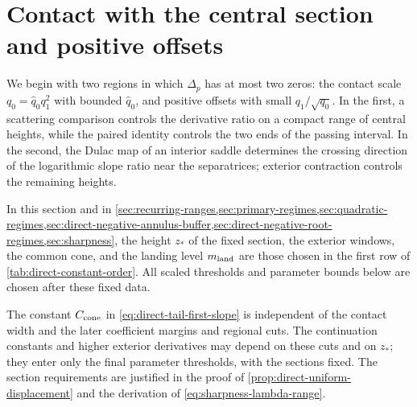 \section{Contact with the central section and positive offsets}
\label{sec:contact-positive-offsets}

We begin with two regions in which \(\Delta_p\) has at most two zeros: the contact scale
\(q_0=\widehat q_0q_1^2\) with bounded \(\widehat q_0\), and positive
offsets with small \(q_1/\sqrt{q_0}\). In the first, a scattering
comparison controls the derivative ratio on a compact range of central
heights, while the paired identity controls the two ends of the passing
interval. In the second, the Dulac map of an interior saddle determines
the crossing direction of the logarithmic slope ratio near the
separatrices; exterior contraction controls the remaining heights.

In this section and in
\cref{sec:recurring-ranges,sec:primary-regimes,sec:quadratic-regimes,sec:direct-negative-annulus-buffer,sec:direct-negative-root-regimes,sec:sharpness},
the height \(z_*\) of the fixed section, the exterior windows, the common
cone, and the landing level \(m_{\rm land}\) are those chosen in the first
row of \cref{tab:direct-constant-order}. All scaled thresholds and parameter
bounds below are chosen after these fixed data.

The constant \(C_{\rm cone}\) in \eqref{eq:direct-tail-first-slope} is
independent of the contact width and the later coefficient margins and
regional cuts.
The continuation constants and higher exterior derivatives may depend
on these cuts and on \(z_*\); they enter only the final parameter
thresholds, with the sections fixed. The section requirements are justified
in the proof of \cref{prop:direct-uniform-displacement} and the derivation
of \eqref{eq:sharpness-lambda-range}.
